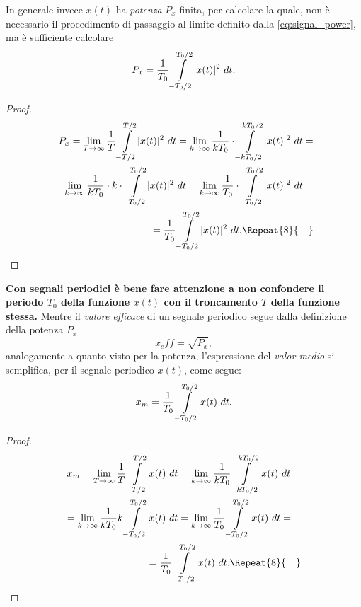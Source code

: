 \documentclass[12pt,oneside,openany]{memoir}
\numberwithin{equation}{subsection}
\DeclarePairedDelimiter{\abs}{\lvert}{\rvert}
\newcommand{\quads}[1]{\Repeat{#1}{\quad}}
\newcommand{\dt}{\ dt}
\begin{document}
In generale invece $x(t)$ ha \textit{potenza} $P_x$ finita, per calcolare la 
quale, non \`e necessario il procedimento di passaggio al limite definito dalla
\eqref{eq:signal_power}, ma \`e sufficiente calcolare
\begin{equation}
	P_x = \frac{1}{T_0} \int\displaylimits_{-T_0/2}^{T_0/2} \abs{x(t)}^2
	\dt.
\end{equation}
\begin{proof}
\begin{equation}
\begin{split}
	P_x = \lim_{T \rightarrow \infty} \frac{1}{T} 
	\int\displaylimits_{-T/2}^{T/2} \abs{x(t)}^2 \dt = 
	\lim_{k \rightarrow \infty} \frac{1}{kT_0} \cdot 
	\int\displaylimits_{-kT_0/2}^{kT_0/2} \abs{x(t)}^2 \dt =
	\\
	= \lim_{k \rightarrow \infty} \frac{1}{kT_0} \cdot k \cdot 
	\int\displaylimits_{-T_0/2}^{T_0/2} \abs{x(t)}^2 \dt = 
	\lim_{k \rightarrow \infty} \frac{1}{T_0} \cdot 
	\int\displaylimits_{-T_0/2}^{T_0/2} \abs{x(t)}^2 \dt =
	\\
	= \frac{1}{T_0} \int\displaylimits_{-T_0/2}^{T_0/2} \abs{x(t)}^2 \dt.
	\quads{8}
\end{split}
\end{equation}
\end{proof}
\textbf{Con segnali periodici \`e bene fare attenzione a non confondere il
periodo $T_0$ della funzione $x(t)$ con il troncamento $T$ della funzione
stessa.}
\bigbreak
Mentre il \textit{valore efficace} di un segnale periodico segue dalla
definizione della potenza $P_x$
\begin{equation}
	x_eff = \sqrt{P_x},
\end{equation}
analogamente a quanto visto per la potenza, l'espressione del \textit{valor
medio} si semplifica, per il segnale periodico $x(t)$, come segue:
\begin{equation}
	x_m = \frac{1}{T_0} \int\displaylimits_{-T_0/2}^{T_0/2} x(t) \dt.
\end{equation}
\begin{proof}
\begin{equation}
\begin{split}
	x_m = \lim_{T \rightarrow \infty} \frac{1}{T} 
	\int\displaylimits_{-T/2}^{T/2} x(t) \dt = \lim_{k \rightarrow \infty}
	\frac{1}{kT_0} \int\displaylimits_{-kT_0/2}^{kT_0/2} x(t) \dt =
	\\
	= \lim_{k \rightarrow \infty} \frac{1}{kT_0} k 
	\int\displaylimits_{-T_0/2}^{T_0/2} x(t) \dt = 
	\lim_{k \rightarrow \infty} \frac{1}{T_0} 
	\int\displaylimits_{-T_0/2}^{T_0/2} x(t) \dt =
	\quad
	\\
	= \frac{1}{T_0} \int\displaylimits_{-T_0/2}^{T_0/2} x(t) \dt.
	\quads{8}
\end{split}
\end{equation}
\end{proof}
\end{document}
